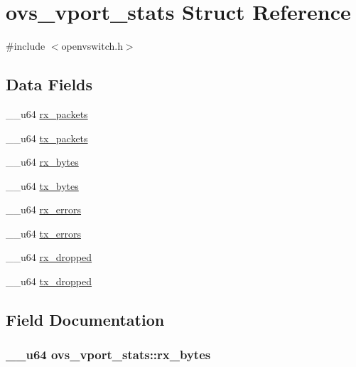\hypertarget{structovs__vport__stats}{}\section{ovs\+\_\+vport\+\_\+stats Struct Reference}
\label{structovs__vport__stats}


{\ttfamily \#include $<$openvswitch.\+h$>$}

\subsection*{Data Fields}
\begin{DoxyCompactItemize}
\item 
\+\_\+\+\_\+u64 \hyperlink{structovs__vport__stats_ae40f3501f32e41cdf6658cc8725f48e7}{rx\+\_\+packets}
\item 
\+\_\+\+\_\+u64 \hyperlink{structovs__vport__stats_adb91be6e2d6695cb19acc87d817191c5}{tx\+\_\+packets}
\item 
\+\_\+\+\_\+u64 \hyperlink{structovs__vport__stats_a27cf52cea0ff9168cd2b536edee94284}{rx\+\_\+bytes}
\item 
\+\_\+\+\_\+u64 \hyperlink{structovs__vport__stats_a2602d5f9072e762b4a6091874c02fd1c}{tx\+\_\+bytes}
\item 
\+\_\+\+\_\+u64 \hyperlink{structovs__vport__stats_a95d0551abc4c1f3874e60fbaa593a63c}{rx\+\_\+errors}
\item 
\+\_\+\+\_\+u64 \hyperlink{structovs__vport__stats_ac0233ed277e2568b4471479beaa4b642}{tx\+\_\+errors}
\item 
\+\_\+\+\_\+u64 \hyperlink{structovs__vport__stats_a91152608a32f597ef28ef5de32b716e9}{rx\+\_\+dropped}
\item 
\+\_\+\+\_\+u64 \hyperlink{structovs__vport__stats_a9b32bc999ba296823133077db108027f}{tx\+\_\+dropped}
\end{DoxyCompactItemize}


\subsection{Field Documentation}
\hypertarget{structovs__vport__stats_a27cf52cea0ff9168cd2b536edee94284}{}
\subsubsection[{rx\+\_\+bytes}]{\setlength{\rightskip}{0pt plus 5cm}\+\_\+\+\_\+u64 ovs\+\_\+vport\+\_\+stats\+::rx\+\_\+bytes}\label{structovs__vport__stats_a27cf52cea0ff9168cd2b536edee94284}
\hypertarget{structovs__vport__stats_a91152608a32f597ef28ef5de32b716e9}{}
